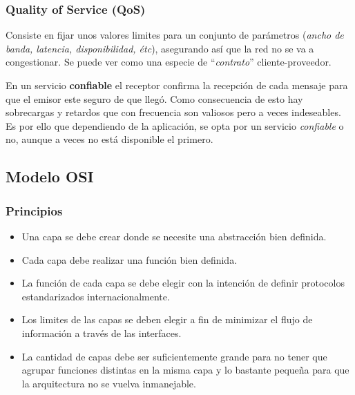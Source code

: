 \documentclass[10pt,a4paper]{article}
\begin{document}
\subsubsection{Quality of Service (QoS)}

Consiste en fijar unos valores limites para un conjunto de parámetros (\textit{ancho de banda, latencia, disponibilidad, étc}), asegurando así que la red no se va a congestionar. Se puede ver como una especie de ``\textit{contrato}'' cliente-proveedor.

En un servicio \textbf{confiable} el receptor confirma la recepción de cada mensaje para que el emisor este seguro de que llegó. Como consecuencia de esto hay sobrecargas y retardos que con frecuencia son valiosos pero a veces indeseables. Es por ello que dependiendo de la aplicación, se opta por un servicio \textit{confiable} o no, aunque a veces no está disponible el primero.

\subsection{Modelo OSI}

\subsubsection{Principios}
\begin{itemize}
\item Una capa se debe crear donde se necesite una abstracción bien definida.
\item Cada capa debe realizar una función bien definida.
\item La función de cada capa se debe elegir con la intención de definir protocolos estandarizados internacionalmente.
\item Los limites de las capas se deben elegir a fin de minimizar el flujo de información a través de las interfaces.
\item La cantidad de capas debe ser suficientemente grande para no tener que agrupar funciones distintas en la misma capa y lo bastante pequeña para que la arquitectura no se vuelva inmanejable.
\end{itemize}
\end{document}
